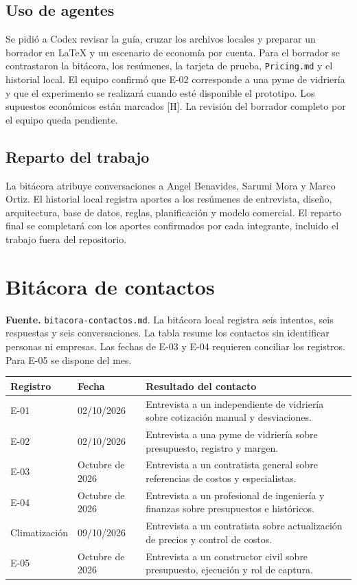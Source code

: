 \documentclass[11pt]{article}
\newcommand{\hip}{\textcolor{prorange}{[H]}}
\begin{document}
\subsection{Uso de agentes}
Se pidió a Codex revisar la guía, cruzar los archivos locales y preparar
un borrador en LaTeX y un escenario de economía por cuenta. Para el
borrador se contrastaron la bitácora, los resúmenes, la tarjeta de prueba,
\texttt{Pricing.md} y el historial local. El equipo confirmó que E-02
corresponde a una pyme de vidriería y que el experimento se realizará
cuando esté disponible el prototipo. Los supuestos económicos están
marcados \hip. La revisión del borrador completo por el equipo queda
pendiente.

\subsection{Reparto del trabajo}
La bitácora atribuye conversaciones a Angel Benavides, Sarumi Mora y
Marco Ortiz. El historial local registra aportes a los resúmenes de
entrevista, diseño, arquitectura, base de datos, reglas, planificación y
modelo comercial. El reparto final se completará con los aportes
confirmados por cada integrante, incluido el trabajo fuera del repositorio.

\clearpage
\appendix
\section{Bitácora de contactos}
\textbf{Fuente.} \texttt{bitacora-contactos.md}. La bitácora local
registra seis intentos, seis respuestas y seis conversaciones.
La tabla resume los contactos sin identificar personas ni empresas.
Las fechas de E-03 y E-04 requieren conciliar los registros. Para E-05
se dispone del mes.

\begin{tabularx}{\linewidth}{@{}llX@{}}
\toprule
\textbf{Registro} & \textbf{Fecha} & \textbf{Resultado del contacto} \\
\midrule
E-01 & 02/10/2026 & Entrevista a un independiente de vidriería sobre cotización manual y desviaciones. \\
E-02 & 02/10/2026 & Entrevista a una pyme de vidriería sobre presupuesto, registro y margen. \\
E-03 & Octubre de 2026 & Entrevista a un contratista general sobre referencias de costos y especialistas. \\
E-04 & Octubre de 2026 & Entrevista a un profesional de ingeniería y finanzas sobre presupuestos e históricos. \\
Climatización & 09/10/2026 & Entrevista a un contratista sobre actualización de precios y control de costos. \\
E-05 & Octubre de 2026 & Entrevista a un constructor civil sobre presupuesto, ejecución y rol de captura. \\
\bottomrule
\end{tabularx}
\end{document}
